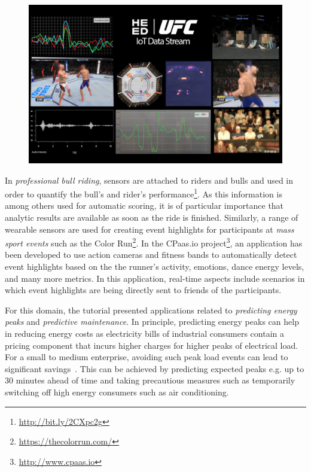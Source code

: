 \begin{figure}[t]
\centering
\includegraphics[scale=0.142]{pictures/DP6L8S9XkAYFMCw.jpg}
\label{FIG:FightStreams}
\end{figure}

In \emph{professional bull riding}, sensors are attached to riders and bulls and used in order to quantify the bull's and rider's performance\footnote{\url{http://bit.ly/2CXpc2g}}. As this information is among others used for automatic scoring, it is of particular importance that analytic results are available as soon as the ride is finished. Similarly, a range of wearable sensors are used for creating event highlights for participants at \emph{mass sport events} such as the Color Run\footnote{\url{https://thecolorrun.com/}}. In the \textsf{CPaas.io} project\footnote{\url{http://www.cpaas.io}}, an application has been developed to use action cameras and fitness bands to automatically detect event highlights based on the the runner's activity, emotions, dance energy levels, and many more metrics. In this application, real-time aspects include scenarios in which event highlights are being directly sent to friends of the participants.

For this domain, the tutorial presented applications related to \emph{predicting energy peaks} and \emph{predictive maintenance}. In principle, predicting energy peaks can help in reducing energy costs as electricity bills of industrial consumers contain a pricing component that incurs higher charges for higher peaks of electrical load. For a small to medium enterprise, avoiding such peak load events can lead to significant savings~\cite{strohbach_and_toll_2016}. This can be achieved by predicting expected peaks e.g. up to 30 minutes ahead of time and taking precautious measures such as temporarily switching off high energy consumers such as air conditioning.

